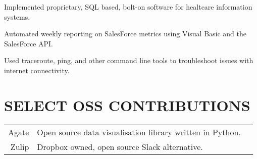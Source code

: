 \documentclass[]{deemweaver}
\begin{document}
\begin{minipage}[t]{0.66\textwidth}
\begin{tightemize}
\item Implemented proprietary, SQL based, bolt-on software for healtcare information systems.
\end{tightemize}
\sectionsep

\begin{tightemize}
\item Automated weekly reporting on SalesForce metrics using Visual Basic and the SalesForce API.
\end{tightemize}
\sectionsep

\begin{tightemize}
\item Used traceroute, ping, and other command line tools to troubleshoot issues with internet connectivity.
\end{tightemize}
\sectionsep


%
%

\section{SELECT OSS CONTRIBUTIONS} 
\begin{tabular}{rll}
Agate	     & Open source data visualisation library written in Python.\\
Zulip	     & Dropbox owned, open source Slack alternative.\\
\end{tabular}
\sectionsep


\end{minipage} 
\end{document}
